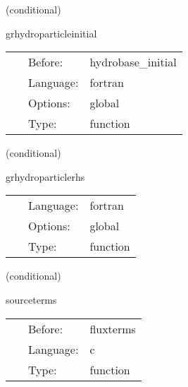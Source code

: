 \vspace{5mm}

   (conditional) 

\hspace{5mm} grhydroparticleinitial 

\hspace{5mm}{\it initial data for the particle arrays } 


\hspace{5mm}

 \begin{tabular*}{160mm}{cll} 
~ & Before:  & hydrobase\_initial \\ 
~ & Language:  & fortran \\ 
~ & Options:  & global \\ 
~ & Type:  & function \\ 
\end{tabular*} 


\vspace{5mm}

   (conditional) 

\hspace{5mm} grhydroparticlerhs 

\hspace{5mm}{\it update terms for the particles } 


\hspace{5mm}

 \begin{tabular*}{160mm}{cll} 
~ & Language:  & fortran \\ 
~ & Options:  & global \\ 
~ & Type:  & function \\ 
\end{tabular*} 


\vspace{5mm}

   (conditional) 

\hspace{5mm} sourceterms 

\hspace{5mm}{\it source term calculation } 


\hspace{5mm}

 \begin{tabular*}{160mm}{cll} 
~ & Before:  & fluxterms \\ 
~ & Language:  & c \\ 
~ & Type:  & function \\ 
\end{tabular*} 


